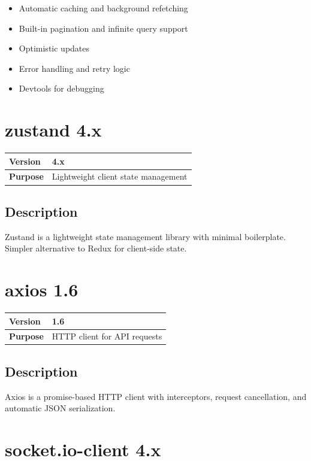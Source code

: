 \documentclass[12pt,a4paper]{report}
\begin{document}
\begin{itemize}
    \item Automatic caching and background refetching
    \item Built-in pagination and infinite query support
    \item Optimistic updates
    \item Error handling and retry logic
    \item Devtools for debugging
\end{itemize}

\section{zustand 4.x}

\begin{tabular}{|p{4cm}|p{10cm}|}
\hline
\textbf{Version} & 4.x \\
\hline
\textbf{Purpose} & Lightweight client state management \\
\hline
\end{tabular}

\subsection{Description}

Zustand is a lightweight state management library with minimal boilerplate. Simpler alternative to Redux for client-side state.

\section{axios 1.6}

\begin{tabular}{|p{4cm}|p{10cm}|}
\hline
\textbf{Version} & 1.6 \\
\hline
\textbf{Purpose} & HTTP client for API requests \\
\hline
\end{tabular}

\subsection{Description}

Axios is a promise-based HTTP client with interceptors, request cancellation, and automatic JSON serialization.

\section{socket.io-client 4.x}
\end{document}
